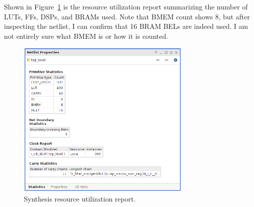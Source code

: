 \documentclass{article}
\begin{document}
    Shown in Figure~\ref{fig:utilization} is the resource utilization report summarizing the number of LUTs, FFs, DSPs, and BRAMs used.
    Note that BMEM count shows 8, but after inspecting the netlist, I can confirm that 16 BRAM BELs are indeed used.
    I am not entirely sure what BMEM is or how it is counted.
    \begin{figure}
        \centering
        \includegraphics[width=0.75\textwidth]{figures/utilization.png}
        \caption{
            Synthesis resource utilization report.
        }
        \label{fig:utilization}
    \end{figure}
\end{document}
